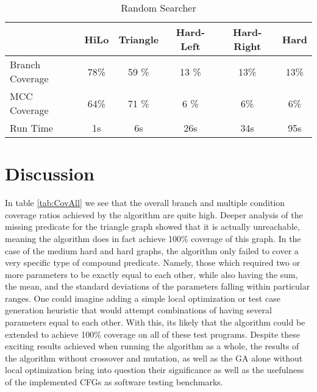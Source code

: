\documentclass[runningheads]{llncs}
\begin{document}
\begin{table}[h!]
	\begin{center}
		
		\def\arraystretch{1.3}%
		\setlength\tabcolsep{1em}
		\begin{tabular}{| l | c  c  c  c c |}
			\hline
							 & HiLo  		 & Triangle		& Hard-Left	& 	Hard-Right 		& Hard		\\ \hline
			Branch Coverage	 & 78\%         & 59	\%      & 13 \%      	& 13\%          & 13\%      \\ \hline
			MCC Coverage	 & 64\%         & 71 \%        & 6 \%      	& 6\%          & 6\%      \\ \hline
			Run Time		 & 1s          	 & 6s           & 26s       	& 34s          	& 95s       \\ \hline
		\end{tabular}
	\end{center}
\caption{Random Searcher \label{tab:randSrch}}
\end{table}

\FloatBarrier
\newpage
\section{Discussion}
In table \ref{tab:CovAll} we see that the overall branch and multiple condition coverage ratios achieved by the algorithm are quite high. Deeper analysis of the missing predicate for the triangle graph showed that it is actually unreachable, meaning the algorithm does in fact achieve 100\% coverage of this graph. In the case of the medium hard and hard graphs, the algorithm only failed to cover a very specific type of compound predicate. Namely, those which required two or more parameters to be exactly equal to each other, while also having the sum, the mean, and the standard deviations of the parameters falling within particular ranges. One could imagine adding a simple local optimization or test case generation heuristic that would attempt combinations of having several parameters equal to each other. With this, its likely that the algorithm could be extended to achieve 100\% coverage on all of these test programs. Despite these exciting results achieved when running the algorithm as a whole, the results of the algorithm without crossover and mutation, as well as the GA alone without local optimization bring into question their significance as well as the usefulness of the implemented CFGs as software testing benchmarks.
\end{document}
